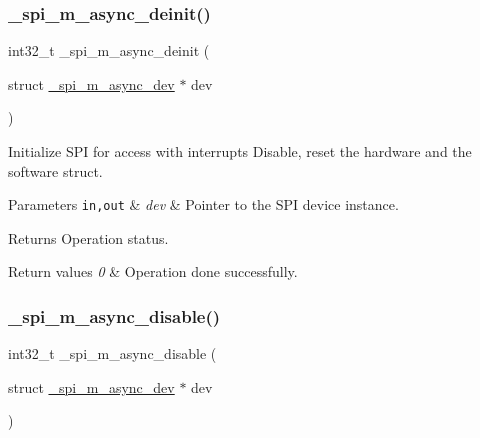 \subsubsection{\texorpdfstring{\+\_\+spi\+\_\+m\+\_\+async\+\_\+deinit()}{\_spi\_m\_async\_deinit()}}
{\footnotesize\ttfamily int32\+\_\+t \+\_\+spi\+\_\+m\+\_\+async\+\_\+deinit (\begin{DoxyParamCaption}\item[{struct \hyperlink{group__hpl__spi_gaab37ebaab3686617eb20d5d175e82e6a}{\+\_\+spi\+\_\+m\+\_\+async\+\_\+dev} $\ast$}]{dev }\end{DoxyParamCaption})}



Initialize S\+PI for access with interrupts Disable, reset the hardware and the software struct. 


\begin{DoxyParams}[1]{Parameters}
\mbox{\tt in,out}  & {\em dev} & Pointer to the S\+PI device instance. \\
\hline
\end{DoxyParams}
\begin{DoxyReturn}{Returns}
Operation status. 
\end{DoxyReturn}

\begin{DoxyRetVals}{Return values}
{\em 0} & Operation done successfully. \\
\hline
\end{DoxyRetVals}
\mbox{\label{group__hpl__spi_gaaeefe807432ef5d2416ba1659b9f807f}} 
\subsubsection{\texorpdfstring{\+\_\+spi\+\_\+m\+\_\+async\+\_\+disable()}{\_spi\_m\_async\_disable()}}
{\footnotesize\ttfamily int32\+\_\+t \+\_\+spi\+\_\+m\+\_\+async\+\_\+disable (\begin{DoxyParamCaption}\item[{struct \hyperlink{group__hpl__spi_gaab37ebaab3686617eb20d5d175e82e6a}{\+\_\+spi\+\_\+m\+\_\+async\+\_\+dev} $\ast$}]{dev }\end{DoxyParamCaption})}



